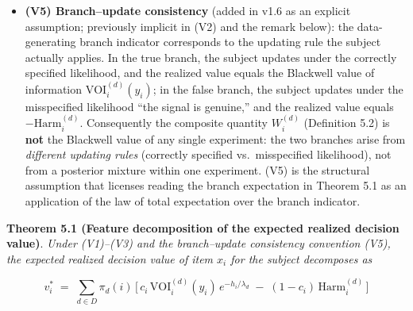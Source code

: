 \documentclass[
  11pt]{article}
\begin{document}
\begin{itemize}
\item
  \textbf{(V5) Branch--update consistency} (added in v1.6 as an explicit
  assumption; previously implicit in (V2) and the remark below): the
  data-generating branch indicator corresponds to the updating rule the
  subject actually applies. In the true branch, the subject updates
  under the correctly specified likelihood, and the realized value
  equals the Blackwell value of information
  \(\mathrm{VOI}_i^{(d)}(y_i)\); in the false branch, the subject
  updates under the misspecified likelihood ``the signal is genuine,''
  and the realized value equals \(-\mathrm{Harm}_i^{(d)}\). Consequently
  the composite quantity \(W_i^{(d)}\) (Definition 5.2) is \textbf{not}
  the Blackwell value of any single experiment: the two branches arise
  from \emph{different updating rules} (correctly specified
  vs.~misspecified likelihood), not from a posterior mixture within one
  experiment. (V5) is the structural assumption that licenses reading
  the branch expectation in Theorem 5.1 as an application of the law of
  total expectation over the branch indicator.
\end{itemize}

\textbf{Theorem 5.1 (Feature decomposition of the expected realized
decision value)}. \emph{Under (V1)--(V3) and the branch--update
consistency convention (V5), the expected realized decision value of
item \(x_i\) for the subject decomposes as}

\[v_i^* \;=\; \sum_{d \in D} \pi_d(i)\,\Big[\, c_i\,\mathrm{VOI}_i^{(d)}(y_i)\,e^{-h_i/\lambda_d} \;-\; (1 - c_i)\,\mathrm{Harm}_i^{(d)} \,\Big]\]
\end{document}
